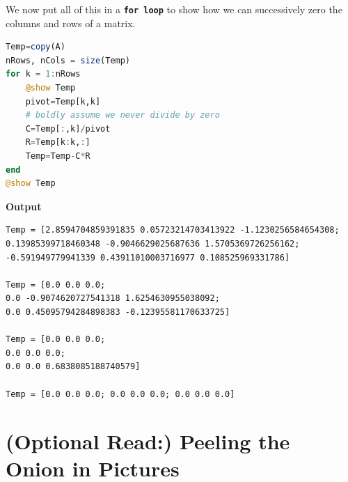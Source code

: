 We now put all of this in a \texttt{\bf for loop} to show how we can successively zero the columns and rows of a matrix. 
\begin{lstlisting}[language=Julia,style=mystyle]
Temp=copy(A)
nRows, nCols = size(Temp)
for k = 1:nRows
    @show Temp
    pivot=Temp[k,k]
    # boldly assume we never divide by zero
    C=Temp[:,k]/pivot
    R=Temp[k:k,:]
    Temp=Temp-C*R
end
@show Temp
\end{lstlisting}
\textbf{Output}
\begin{verbatim}
Temp = [2.8594704859391835 0.05723214703413922 -1.1230256584654308;
0.13985399718460348 -0.9046629025687636 1.5705369726256162;
-0.591949779941339 0.43911010003716977 0.108525969331786]

Temp = [0.0 0.0 0.0; 
0.0 -0.9074620727541318 1.6254630955038092; 
0.0 0.45095794284898383 -0.12395581170633725]

Temp = [0.0 0.0 0.0; 
0.0 0.0 0.0; 
0.0 0.0 0.6838085188740579]

Temp = [0.0 0.0 0.0; 0.0 0.0 0.0; 0.0 0.0 0.0]
\end{verbatim}  
    
   \vspace*{.4cm}
\section{(Optional Read:) Peeling the Onion in Pictures}
\label{sec:OnionPeelingPictures} 

